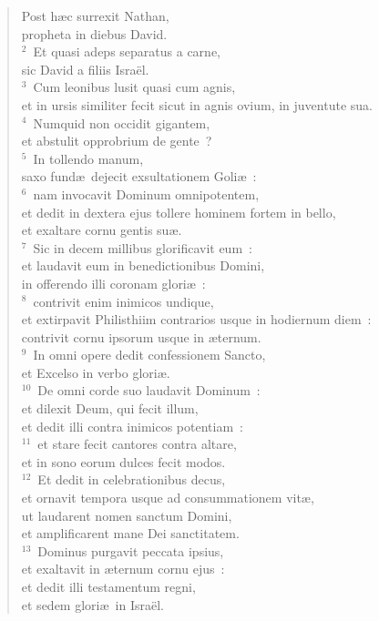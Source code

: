 \begin{flushleft}\begin{verse}\vspace{-19pt}\hspace{6pt}Post h\ae c surrexit Nathan,\\\hspace{6pt} propheta in diebus David.\\
${}^{2}$~Et quasi adeps separatus a carne,\\ sic David a filiis Isra\"el.\\
${}^{3}$~Cum leonibus lusit quasi cum agnis,\\ et in ursis similiter fecit sicut in agnis ovium, in juventute sua.\\
${}^{4}$~Numquid non occidit gigantem,\\ et abstulit opprobrium de gente~?\\
${}^{5}$~In tollendo manum,\\ saxo fund\ae\ dejecit exsultationem Goli\ae~:\\
${}^{6}$~nam invocavit Dominum omnipotentem,\\ et dedit in dextera ejus tollere hominem fortem in bello,\\ et exaltare cornu gentis su\ae .\\
${}^{7}$~Sic in decem millibus glorificavit eum~:\\ et laudavit eum in benedictionibus Domini,\\ in offerendo illi coronam glori\ae~:\\
${}^{8}$~contrivit enim inimicos undique,\\ et extirpavit Philisthiim contrarios usque in hodiernum diem~:\\ contrivit cornu ipsorum usque in \ae ternum.\\
${}^{9}$~In omni opere dedit confessionem Sancto,\\ et Excelso in verbo glori\ae .\\
${}^{10}$~De omni corde suo laudavit Dominum~:\\ et dilexit Deum, qui fecit illum,\\ et dedit illi contra inimicos potentiam~:\\
${}^{11}$~et stare fecit cantores contra altare,\\ et in sono eorum dulces fecit modos.\\
${}^{12}$~Et dedit in celebrationibus decus,\\ et ornavit tempora usque ad consummationem vit\ae ,\\ ut laudarent nomen sanctum Domini,\\ et amplificarent mane Dei sanctitatem.\\
${}^{13}$~Dominus purgavit peccata ipsius,\\ et exaltavit in \ae ternum cornu ejus~:\\ et dedit illi testamentum regni,\\ et sedem glori\ae\ in Isra\"el.\end{verse}\end{flushleft}


